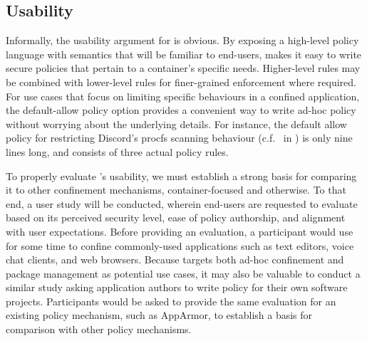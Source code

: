 \subsection{Usability}

Informally, the usability argument for \bpfcontain{} is obvious. By exposing a high-level policy language with semantics that will be familiar to end-users, \bpfcontain{} makes it easy to write secure policies that pertain to a container's specific needs. Higher-level rules may be combined with lower-level rules for finer-grained enforcement where required. For use cases that focus on limiting specific behaviours in a confined application, the default-allow policy option provides a convenient way to write ad-hoc policy without worrying about the underlying details. For instance, the default allow policy for restricting Discord's procfs scanning behaviour (c.f.~ in ) is only nine lines long, and consists of three actual policy rules.

To properly evaluate \bpfcontain{}'s usability, we must establish a strong basis for comparing it to other confinement mechanisms, container-focused and otherwise. To that end, a user study will be conducted, wherein end-users are requested to evaluate \bpfcontain{} based on its perceived security level, ease of policy authorship, and alignment with user expectations. Before providing an evaluation, a participant would use \bpfcontain{} for some time to confine commonly-used applications such as text editors, voice chat clients, and web browsers. Because \bpfcontain{} targets both ad-hoc confinement and package management as potential use cases, it may also be valuable to conduct a similar study asking application authors to write \bpfcontain{} policy for their own software projects.  Participants would be asked to provide the same evaluation for an existing policy mechanism, such as AppArmor, to establish a basis for comparison with other policy mechanisms.

